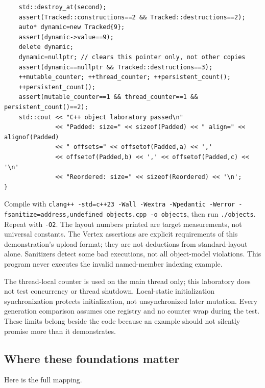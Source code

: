 \begin{verbatim}
    std::destroy_at(second);
    assert(Tracked::constructions==2 && Tracked::destructions==2);
    auto* dynamic=new Tracked{9};
    assert(dynamic->value==9);
    delete dynamic;
    dynamic=nullptr; // clears this pointer only, not other copies
    assert(dynamic==nullptr && Tracked::destructions==3);
    ++mutable_counter; ++thread_counter; ++persistent_count();
    ++persistent_count();
    assert(mutable_counter==1 && thread_counter==1 && persistent_count()==2);
    std::cout << "C++ object laboratory passed\n"
              << "Padded: size=" << sizeof(Padded) << " align=" << alignof(Padded)
              << " offsets=" << offsetof(Padded,a) << ','
              << offsetof(Padded,b) << ',' << offsetof(Padded,c) << '\n'
              << "Reordered: size=" << sizeof(Reordered) << '\n';
}
\end{verbatim}

Compile with \texttt{clang++\ -std=c++23\ -Wall\ -Wextra\ -Wpedantic\ -Werror\ -fsanitize=address,undefined\ objects.cpp\ -o\ objects}, then run \texttt{./objects}. Repeat with \texttt{-O2}. The layout numbers printed are target measurements, not universal constants. The Vertex assertions are explicit requirements of this demonstration's upload format; they are not deductions from standard-layout alone. Sanitizers detect some bad executions, not all object-model violations. This program never executes the invalid named-member indexing example.

The thread-local counter is used on the main thread only; this laboratory does not test concurrency or thread shutdown. Local-static initialization synchronization protects initialization, not unsynchronized later mutation. Every generation comparison assumes one registry and no counter wrap during the test. These limits belong beside the code because an example should not silently promise more than it demonstrates.

\subsection{Where these foundations matter}\label{where-these-foundations-matter}

Here is the full mapping.

